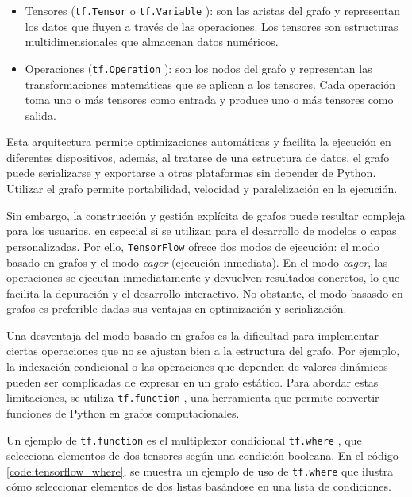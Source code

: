\begin{itemize}
    \item Tensores (\texttt{tf.Tensor} \cite{tensorflow_tensor} o \texttt{tf.Variable} \cite{tensorflow_variable}): son las aristas del grafo y representan los datos que fluyen a través de las operaciones. Los tensores son estructuras multidimensionales que almacenan datos numéricos.
    \item Operaciones (\texttt{tf.Operation} \cite{tensorflow_operation}): son los nodos del grafo y representan las transformaciones matemáticas que se aplican a los tensores. Cada operación toma uno o más tensores como entrada y produce uno o más tensores como salida.
\end{itemize}

Esta arquitectura permite optimizaciones automáticas y facilita la ejecución en diferentes dispositivos, además, al tratarse de una estructura de datos, el grafo puede serializarse y exportarse a otras plataformas sin depender de Python. Utilizar el grafo permite portabilidad, velocidad y paralelización en la ejecución.

Sin embargo, la construcción y gestión explícita de grafos puede resultar compleja para los usuarios, en especial si se utilizan para el desarrollo de modelos o capas personalizadas. Por ello, \texttt{TensorFlow} ofrece dos modos de ejecución: el modo basado en grafos \cite{tensorflow_graphs} y el modo \textit{eager} \cite{tensorflow_eager_execution} (ejecución inmediata). En el modo \textit{eager}, las operaciones se ejecutan inmediatamente y devuelven resultados concretos, lo que facilita la depuración y el desarrollo interactivo. No obstante, el modo basasdo en grafos es preferible dadas sus ventajas en optimización y serialización.

Una desventaja del modo basado en grafos es la dificultad para implementar ciertas operaciones que no se ajustan bien a la estructura del grafo. Por ejemplo, la indexación condicional o las operaciones que dependen de valores dinámicos pueden ser complicadas de expresar en un grafo estático. Para abordar estas limitaciones, se utiliza \texttt{tf.function} \cite{tensorflow_function}, una herramienta que permite convertir funciones de Python en grafos computacionales.

Un ejemplo de \texttt{tf.function} es el multiplexor condicional \texttt{tf.where} \cite{tensorflow_where}, que selecciona elementos de dos tensores según una condición booleana. En el código \ref{code:tensorflow_where}, se muestra un ejemplo de uso de \texttt{tf.where} que ilustra cómo seleccionar elementos de dos listas basándose en una lista de condiciones.

